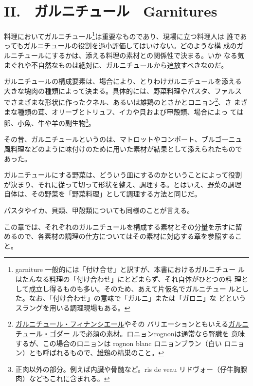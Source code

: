 \hypertarget{ii.ux30acux30ebux30cbux30c1ux30e5ux30fcux30ebgarnitures}{%
\chapter{II.　ガルニチュール　Garnitures}\label{ii.ux30acux30ebux30cbux30c1ux30e5ux30fcux30ebgarnitures}}

 

\vspace*{1.7\zw}

料理においてガルニチュール\footnote{garniture
  一般的には「付け合せ」と訳すが、本書におけるガルニチュー
  ルはたんなる料理の「付け合わせ」にとどまらず、それ自体がひとつの料
  理として成立し得るものも多い。そのため、あえて片仮名でガルニチュー
  ルとした。なお、「付け合わせ」の意味で「ガルニ」または「ガロニ」な
  どというスラングを用いる調理現場もある。}は重要なものであり、現場に立つ料理人は
誰であってもガルニチュールの役割を過小評価してはいけない。どのような構
成のガルニチュールにするかは、添える料理の素材との関係性で決まる。いか
なる気まぐれや不自然なものは絶対に、ガルニチュールから追放すべきなのだ。

ガルニチュールの構成要素は、場合により、とりわけガルニチュールを添える
大きな塊肉の種類によって決まる。具体的には、野菜料理やパスタ、ファルス
でさまざまな形状に作ったクネル、あるいは雄鶏のとさかとロニョン\footnote{\protect\hyperlink{garniture-financiere}{ガルニチュール・フィナンシエール}やその
  バリエーションともいえる\protect\hyperlink{garniture-godard}{ガルニチュール・ゴダー
  ル}で必須の素材。ロニョンrognonは通常なら腎臓を
  意味するが、この場合のロニョンは rognon blanc ロニョンブラン（白い
  ロニョン）とも呼ばれるもので、雄鶏の精巣のこと。}、さ
まざまな種類の茸、オリーブとトリュフ、イカや貝および甲殻類、場合によっ
ては卵、小魚、牛や羊の副生物\footnote{正肉以外の部分。例えば内臓や骨髄など。ris
  de veau リドヴォー（仔牛胸腺肉）などもこれに含まれる。}。

その昔、ガルニチュールというのは、マトロットやコンポート、ブルゴーニュ
風料理などのように味付けのために用いた素材が結果として添えられたもので
あった。

ガルニチュールにする野菜は、どういう皿にするのかということによって役割
が決まり、それに従って切って形状を整え、調理する。とはいえ、野菜の調理
自体は、その野菜を「野菜料理」として調理する方法と同じだ。

パスタやイカ、貝類、甲殻類についても同様のことが言える。

この章では、それぞれのガルニチュールを構成する素材とその分量を示すに留
めるので、各素材の調理の仕方についてはその素材に対応する章を参照するこ
と。


